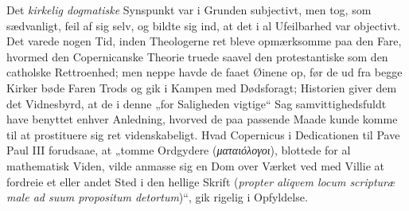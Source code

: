 \documentclass[12pt,a4paper]{book}
\begin{document}
Det \emph{kirkelig dogmatiske} Synspunkt var i Grunden subjectivt, men
tog, som sædvanligt, feil af sig selv, og bildte sig ind, at det i al
Ufeilbarhed var objectivt. Det varede nogen Tid, inden Theologerne ret
bleve opmærksomme paa den Fare, hvormed den Copernicanske Theorie
truede saavel den protestantiske som den catholske Rettroenhed; men
neppe havde de faaet Øinene op, før de ud fra begge Kirker bøde Faren
Trods og gik i Kampen med Dødsforagt; Historien giver dem det
Vidnesbyrd, at de i denne „for Saligheden vigtige“ Sag
samvittighedsfuldt have benyttet enhver Anledning, hvorved de paa
passende Maade kunde komme til at prostituere sig ret videnskabeligt.
Hvad Copernicus i Dedicationen til Pave Paul III forudsaae, at „tomme
Ordgydere (\textit{ματαιόλογοι}), blottede for al mathematisk Viden,
vilde anmasse sig en Dom over Værket ved med Villie at fordreie et
eller andet Sted i den hellige
Skrift (\textit{propter aliqvem locum scripturæ male ad suum propositum
detortum})“, gik rigelig i Opfyldelse.
\end{document}
